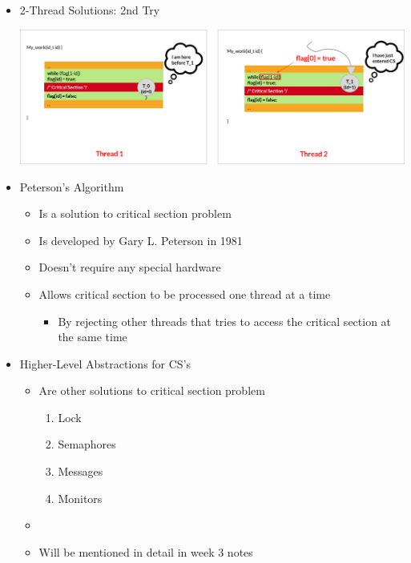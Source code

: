 \documentclass[12pt]{article}
\begin{document}
\begin{itemize}
    \item 2-Thread Solutions: 2nd Try


    \begin{center}
    \includegraphics[width=\linewidth]{images/week_2_notes_2_12.png}
    \end{center}

    \item Peterson's Algorithm

    \begin{itemize}
        \item Is a solution to critical section problem
        \item Is developed by Gary L. Peterson in 1981
        \item Doesn't require any special hardware
        \item Allows critical section to be processed one thread at a time
        \begin{itemize}
            \item By rejecting other threads that tries to access the
            critical section at the same time
        \end{itemize}
    \end{itemize}

    \item Higher-Level Abstractions for CS's
    \begin{itemize}
        \item Are other solutions to critical section problem
        \begin{enumerate}[1.]
            \item Lock
            \item Semaphores
            \item Messages
            \item Monitors
        \end{enumerate}
        \item
        \item Will be mentioned in detail in week 3 notes
    \end{itemize}


\end{itemize}
\end{document}
